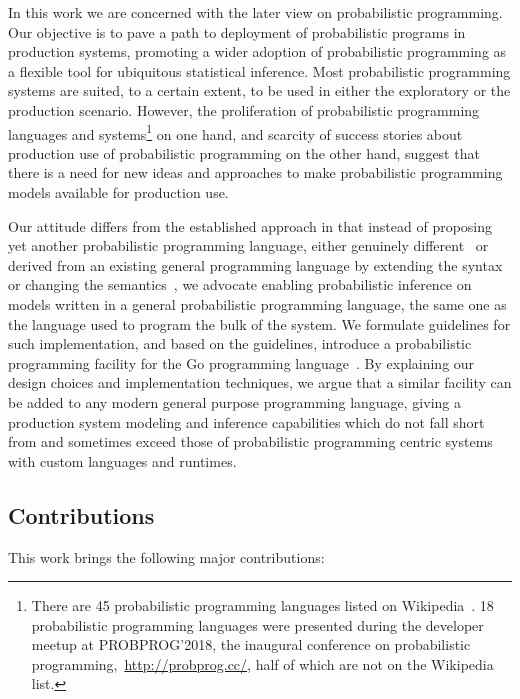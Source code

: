 \documentclass[sigplan,review,10pt,anonymous]{acmart}
\begin{document}
\begin{sloppypar}
	In this work we are concerned with the later view on
	probabilistic programming. Our objective is to pave a path
	to deployment of probabilistic programs in production
	systems, promoting a wider adoption of probabilistic
	programming as a flexible tool for ubiquitous statistical
	inference. Most probabilistic programming systems are
	suited, to a certain extent, to be used in either the
	exploratory or the production scenario. However, the
	proliferation of probabilistic programming languages and
	systems\footnote{There are 45 probabilistic programming
	languages listed on
	Wikipedia~\cite{wiki:Probabilistic_programming_language}. 18
	probabilistic programming languages were presented during
	the developer meetup at PROBPROG'2018, the inaugural
	conference on probabilistic
	programming,~\url{http://probprog.cc/}, half of which are
	not on the Wikipedia list.} on one hand, and scarcity of success
	stories about production use of probabilistic programming on
	the other hand, suggest that there is a need for new ideas
	and approaches to make probabilistic programming models
	available for production use.

	Our attitude differs from the established approach in that
	instead of proposing yet another probabilistic programming
	language, either genuinely different~\cite{MMR+07,Stan17} or derived from
	an existing general programming language by extending the
	syntax or changing the semantics~\cite{GMR+08,TMY+16,GXG18}, we advocate
	enabling probabilistic inference on models written in a
	general probabilistic programming language, the same one as
	the language used to program the bulk of the system. We
	formulate guidelines for such implementation, and based on
	the guidelines, introduce a probabilistic programming
	facility for the Go programming language~\cite{Golang}. By
	explaining our design choices and implementation techniques,
	we argue that a similar facility can be added to any modern
	general purpose programming language, giving a production
	system modeling and inference capabilities which do not fall
	short from and sometimes exceed those of probabilistic
	programming centric systems with custom languages and
	runtimes.

	\subsection*{Contributions}

	This work brings the following major contributions:


\end{sloppypar}
\end{document}
